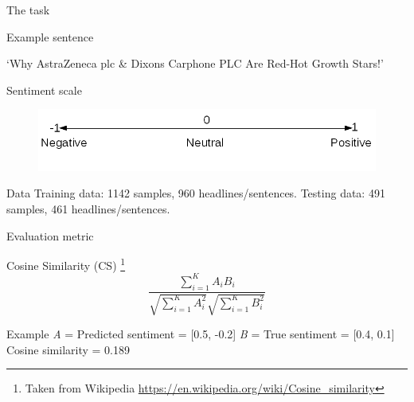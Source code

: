 \documentclass[10pt]{beamer}
\begin{document}
\begin{frame}[fragile]{The task}
\begin{block}{Example sentence}
\begin{center}
`Why \alert{AstraZeneca plc} \& \alert{Dixons Carphone PLC} Are Red-Hot Growth Stars!'
\end{center}
\end{block}

\begin{block}{Sentiment scale}
\begin{figure}
    \includegraphics[scale=0.3]{sentiment_range.png}
  \end{figure}
\end{block}

\begin{block}{Data}
Training data: 1142 samples, 960 headlines/sentences.\newline
Testing data: 491 samples, 461 headlines/sentences.
\end{block}

\end{frame}

\begin{frame}[fragile]{Evaluation metric}
\begin{block}{Cosine Similarity (CS) \footnote{Taken from Wikipedia \url{https://en.wikipedia.org/wiki/Cosine_similarity}}}
\begin{equation}
\frac{ \sum\limits_{i=1}^{K}{A_i  B_i} }{ \sqrt{\sum\limits_{i=1}^{K}{A_i^2}}  \sqrt{\sum\limits_{i=1}^{K}{B_i^2}} }
\end{equation}
\end{block}

\begin{block}{Example}
\textit{A} = Predicted sentiment = [0.5, -0.2] \newline
\textit{B} = True sentiment = [0.4, 0.1] \newline 
Cosine similarity = 0.189
\end{block}

\end{frame}
\end{document}
